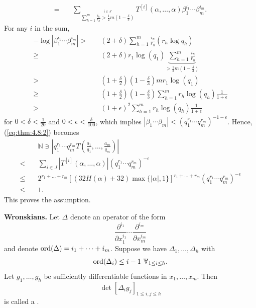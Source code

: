 \documentclass{Vorlesungstemplate_English} %
\newcommand{\Nzero}{\mathbb{N}}
\begin{document}
\begin{pf}
\begin{align}
    = \quad & \sum_{\stackrel{i \in J}{\sum_{h=1}^m \frac{i_h}{r_h} > \frac{1}{2}m(1-\frac{\delta}{3})}} T^{[i]}(\alpha, \dots, \alpha)\beta_1^{i_1}\cdots\beta_m^{i_m}. \tag{$**$}
  \end{align}
  For any $i$ in the sum,
  \begin{align*}
    -\log|\beta_1^{i_1}\cdots\beta_m^{i_m}| > \quad & (2+\delta)\sum_{h=1}^m\frac{i_h}{r_h}(r_h\log q_h) \\
    \geq \quad & (2+\delta)r_1\log(q_1)\underbrace{\sum_{h=1}^m \frac{i_h}{r_h}}_{> \frac{1}{2}m\left(1-\frac{\delta}{3}\right)} \\
    > \quad & \left(1+\frac{\delta}{2}\right)\left(1-\frac{\delta}{3}\right)mr_1\log(q_1) \\
    \geq \quad & \left(1+\frac{\delta}{2}\right)\left(1-\frac{\delta}{3}\right)\sum_{h=1}^m r_h\log(q_h)\frac{1}{1+\epsilon}\\
    > \quad & (1+\epsilon)^2\sum_{h=1}^m r_h\log(q_h)\frac{1}{1+\epsilon}
  \end{align*}
  for $0 < \delta < \frac{1}{20}$ and $0 < \epsilon < \frac{\delta}{100}$, which implies $|\beta_1\cdots\beta_m| <(q_1^{r_1}\cdots q_m^{r_m})^{-1-\epsilon}$. Hence, (\ref{eq:thm:4.8:2}) becomes
  \begin{align*} & \Nzero \ni \left|q_1^{r_1}\cdots q_m^{r_m}T\left(\frac{a_1}{q_1}, \dots, \frac{a_m}{q_m}\right)\right| \\
  < \quad & \sum_{i \in J}|T^{[i]}(\alpha, \dots, \alpha)|(q_1^{r_1}\cdots q_m^{r_m})^{-\epsilon} \\
  \leq \quad & 2^{r_1+\dots+r_m}\left[(32H(\alpha)+32)\max\{ |\alpha|, 1\}\right]^{r_1+\dots+r_m}(q_1^{r_1}\cdots q_m^{r_m})^{-\epsilon} \\
  \leq \quad & 1.\end{align*}
  This proves the assumption.
\end{pf}
\noindent\textbf{Wronskians.} Let $\Delta$ denote an operator of the form
\[
  \frac{\partial^{i_1}}{\partial x_1^{i_1}}\cdots\frac{\partial^{i_m}}{\partial x_m^{i_m}}
\]
and denote $\text{ord}(\Delta)=i_1+\dots+i_m$. Suppose we have $\Delta_1,\dots,\Delta_h$ with
\[
  \ord(\Delta_i)\leq i-1 \forall_{1 \leq i \leq h}.
\]
Let $g_1,\dots,g_h$ be sufficiently differentiable functions in $x_1,\dots,x_m$. Then
\[
  \det\left[\Delta_i g_j\right]_{1 \leq i,j \leq h}
\]
is called a .
\end{document}
